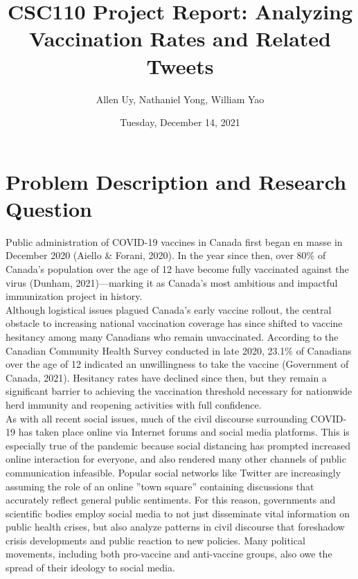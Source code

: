 \documentclass[fontsize=11pt]{article}
\title{CSC110 Project Report: Analyzing Vaccination Rates and Related Tweets }
\author{Allen Uy, Nathaniel Yong, William Yao}
\date{Tuesday, December 14, 2021}
\begin{document}
\maketitle

\section*{Problem Description and Research Question}

Public administration of COVID-19 vaccines in Canada first began en masse in December 2020 (Aiello & Forani, 2020). In the year since then, over 80\% of Canada’s population over the age of 12 have become fully vaccinated against the virus (Dunham, 2021)—marking it as Canada’s most ambitious and impactful immunization project in history. \\

Although logistical issues plagued Canada’s early vaccine rollout, the central obstacle to increasing national vaccination coverage has since shifted to vaccine hesitancy among many Canadians who remain unvaccinated. According to the Canadian Community Health Survey conducted in late 2020, 23.1\% of Canadians over the age of 12 indicated an unwillingness to take the vaccine (Government of Canada, 2021). Hesitancy rates have declined since then, but they remain a significant barrier to achieving the vaccination threshold necessary for nationwide herd immunity and reopening activities with full confidence.\\

As with all recent social issues, much of the civil discourse surrounding COVID-19 has taken place online via Internet forums and social media platforms. This is especially true of the pandemic because social distancing has prompted increased online interaction for everyone, and also rendered many other channels of public communication infeasible. Popular social networks like Twitter are increasingly assuming the role of an online ”town square” containing discussions that accurately reflect general public sentiments. For this reason, governments and scientific bodies employ social media to not just disseminate vital information on public health crises, but also analyze patterns in civil discourse that foreshadow crisis developments and public reaction to new policies. Many political movements, including both pro-vaccine and anti-vaccine groups, also owe the spread of their ideology to social media.\\
\end{document}
